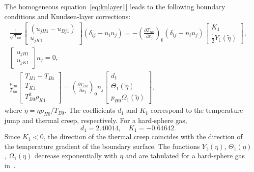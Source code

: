 \documentclass[10pt]{article}
\newcommand{\pder}[2][]{\frac{\partial#1}{\partial#2}}
\newcommand{\deltann}[2]{(\delta_{#1#2}-n_#1 n_#2)}
\newcommand{\onwall}[1]{\left(#1\right)_0}
\begin{document}
The homogeneous equation~\eqref{eq:knlayer1} leads to the following boundary conditions and Knudsen-layer corrections:
\begin{gather}
    \frac1{\sqrt{T_{B0}}}\begin{bmatrix} (u_{jH1} - u_{Bj1}) \\ u_{jK1} \end{bmatrix} \deltann{i}{j} =
        - \onwall{\pder[T_{H0}]{x_j}} \deltann{i}{j}
        \begin{bmatrix} K_1 \\ \frac12 Y_1(\tilde\eta) \end{bmatrix}, \label{eq:boundary_u1t}\\
    \begin{bmatrix} u_{jH1} \\ u_{jK1} \end{bmatrix} n_j = 0, \label{eq:boundary_u1n}\\
    \frac{p_{H0}}{T_{B0}}\begin{bmatrix} T_{H1} - T_{B1} \\ T_{K1} \\ T_{B0}^2\rho_{K1} \end{bmatrix} =
        \onwall{\pder[T_{H0}]{x_j}} n_j
        \begin{bmatrix} d_1 \\ \Theta_1(\tilde\eta) \\ p_{H0}\Omega_1(\tilde\eta) \end{bmatrix}, \label{eq:boundary_T1}
\end{gather}
where \(\tilde\eta = \eta p_{H0}/T_{B0}\).
The coefficients \(d_1\) and \(K_1\) correspond to the temperature jump and thermal creep, respectively.
For a hard-sphere gas,~\cite{Ohwada1989creep, Ohwada1989jump, Takata2015}
\begin{equation}\label{eq:slip_coeffs}
    d_1 = 2.40014, \quad K_1 = -0.64642.
\end{equation}
Since \(K_1<0\), the direction of the thermal creep coincides with the direction of the temperature gradient of the boundary surface.
The functions \(Y_1(\eta)\), \(\Theta_1(\eta)\), \(\Omega_1(\eta)\) decrease exponentially with \(\eta\)
and are tabulated for a hard-sphere gas in~\cite{Ohwada1989creep, Ohwada1989jump, Sone2002, Sone2007, Takata2015}.
\end{document}
